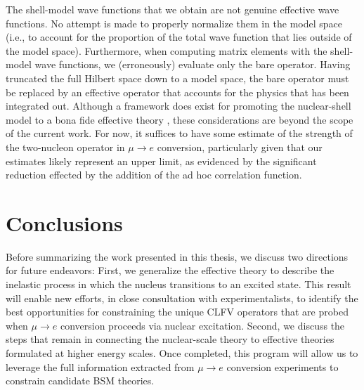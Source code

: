 \documentclass[12pt,letterpaper]{book}
\begin{document}
The shell-model wave functions that we obtain are not genuine effective wave functions. No attempt is made to properly normalize them in the model space (i.e., to account for the proportion of the total wave function that lies outside of the model space). Furthermore, when computing matrix elements with the shell-model wave functions, we (erroneously) evaluate only the bare operator. Having truncated the full Hilbert space down to a model space, the bare operator must be replaced by an effective operator that accounts for the physics that has been integrated out. Although a framework does exist for promoting the nuclear-shell model to a bona fide effective theory \cite{PhysRevLett.84.5484,HAXTON200115,PhysRevLett.89.182503,PhysRevC.77.034005,MCELVAIN2019}, these considerations are beyond the scope of the current work. For now, it suffices to have some estimate of the strength of the two-nucleon operator in $\mu\rightarrow e$ conversion, particularly given that our estimates likely represent an upper limit, as evidenced by the significant reduction effected by the addition of the ad hoc correlation function.

\chapter{Conclusions}
\thispagestyle{headings}
\label{chap:conclusion}
Before summarizing the work presented in this thesis, we discuss two directions for future endeavors: First, we generalize the effective theory to describe the inelastic process in which the nucleus transitions to an excited state. This result will enable new efforts, in close consultation with experimentalists, to identify the best opportunities for constraining the unique CLFV operators that are probed when $\mu\rightarrow e$ conversion proceeds via nuclear excitation. Second, we discuss the steps that remain in connecting the nuclear-scale theory to effective theories formulated at higher energy scales. Once completed, this program will allow us to leverage the full information extracted from $\mu\rightarrow e$ conversion experiments to constrain candidate BSM theories.
\end{document}
